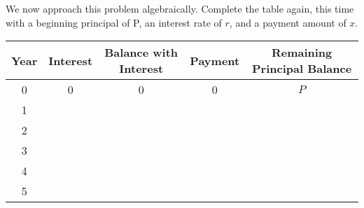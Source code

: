 \documentclass[,nooutcomes]{ximera}
\begin{document}
\break
\begin{question}
We now approach this problem algebraically.   Complete the table again, this time with a beginning principal of P, an interest rate of $r$, and a payment amount of $x$.

\def\arraystretch{2}
\begin{table}[h]
\begin{tabular}{|c|c|c|c|c|}
\hline
Year & Interest & Balance with Interest & Payment & Remaining Principal Balance \\ \hline
0    &   0     &      0             &    0   &   $P$                  \\ \hline
1    &          &                     &         &                             \\ \hline
2    &          &                     &         &                             \\ \hline
3    &          &                     &         &                             \\ \hline
4    &          &                     &         &                             \\ \hline
5    &          &                     &         &                             \\ \hline
\end{tabular}
\end{table}

\begin{freeResponse}
\end{freeResponse}
\end{question}
\end{document}
